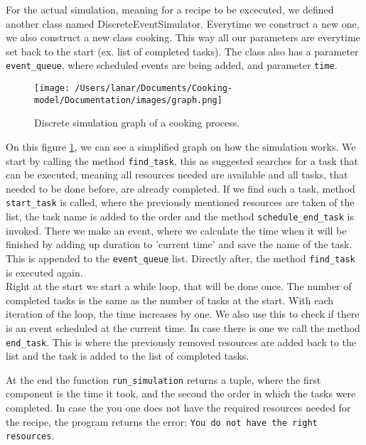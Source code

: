 For the actual simulation, meaning for a recipe to be excecuted, we defined another class named DiscreteEventSimulator. 
Everytime we construct a new one, we also construct a new class cooking. This way all our parameters are everytime set back to the start (ex. list of completed tasks).
The class also has a parameter \texttt{event\_queue}, where scheduled events are being added, and parameter \texttt{time}. \\

\begin{figure}[H]
    \centerline{\texttt{[image: /Users/lanar/Documents/Cooking-model/Documentation/images/graph.png]}}
    \caption{Discrete simulation graph of a cooking process.}
    \label{fig1}
\end{figure}

On this figure \ref{fig1}, we can see a simplified graph on how the simulation works. We start by calling the method \texttt{find\_task}, this as suggested searches for a task that can be executed, meaning all resources needed are available 
and all tasks, that needed to be done before, are already completed. If we find such a task, method \texttt{start\_task} is called, where the previously mentioned resources are taken of the list, the task name is added to the order and the method \texttt{schedule\_end\_task} is invoked. 
There we make an event, where we calculate the time when it will be finished by adding up duration to 'current time' and save the name of the task. This is appended to the \texttt{event\_queue} list. Directly after, the method \texttt{find\_task} is executed again. \\ 

Right at the start we start a while loop, that will be done once. The number of completed tasks is the same as the number of tasks at the start. 
With each iteration of the loop, the time increases by one. We also use this to check if there is an event scheduled at the current time. In case there is one we call the method \texttt{end\_task}. 
This is where the previously removed resources are added back to the list and the task is added to the list of completed tasks. 

At the end the function \texttt{run\_simulation} returns a tuple, where the first component is the time it took, and the second the order in which the tasks were completed. 
In case the you one does not have the required resources needed for the recipe, the program returns the error: \texttt{You do not have the right resources}.

